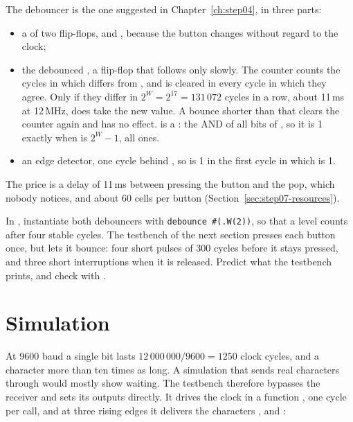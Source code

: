 The debouncer is the one suggested in Chapter~\ref{ch:step04}, in three
parts:
\begin{itemize}
\item a  of two flip-flops,  and ,
  because the button changes without regard to the clock;
\item the debounced , a flip-flop that follows  only
  slowly. The counter  counts the cycles in which  differs
  from , and is cleared in every cycle in which they agree. Only if
  they differ in $2^W = 2^{17} = 131\,072$ cycles in a row, about 11\,ms at
  12\,MHz, does  take the new value. A bounce shorter than that
  clears the counter again and has no effect.  is a :
  the AND of all bits of , so it is 1 exactly when  is
  $2^W - 1$, all ones.
\item an edge detector,  one cycle behind , so
   is 1 in the first cycle in which  is 1.
\end{itemize}
The price is a delay of 11\,ms between pressing the button and the pop, which
nobody notices, and about 60 cells per button
(Section~\ref{sec:step07-resources}).

\begin{exercise}
\label{ex:step07-bounce}
In , instantiate both debouncers with \texttt{debounce \#(.W(2))}, so
that a level counts after four stable cycles. The testbench of the next
section presses each button once, but lets it bounce: four short pulses of
300 cycles before it stays pressed, and three short interruptions when it is
released. Predict what the testbench prints, and check with .
\end{exercise}

\section{Simulation}
\label{sec:step07-sim}

At 9600 baud a single bit lasts $12\,000\,000 / 9600 = 1250$ clock cycles, and
a character more than ten times as long. A simulation that sends real
characters through  would mostly show waiting. The testbench
therefore bypasses the receiver and sets its outputs directly. It drives the
clock in a function , one cycle per call, and at three rising edges
it delivers the characters ,  and :

